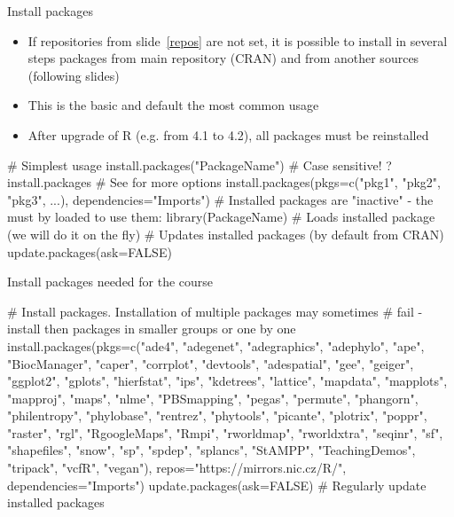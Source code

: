 \documentclass[compress, xelatex, 11pt, xcolor=svgnames, aspectratio=169,
	hyperref={
		bookmarks=true,
		unicode=true,
		colorlinks=true,
		pdftitle={Molecular data in R},
		plainpages=false,
		pdfauthor={Vojtech Zeisek},
		pdfsubject={Course about phylogeny and evolution in R},
		pdfcreator={XeLaTeX},
		pdfkeywords={R, evolution, phylogeny, molecular data},
		linkcolor=Crimson, %
		anchorcolor=Magenta, %
		citecolor=Magenta, %
		filecolor=Magenta, %
		menucolor=Magenta, %
		urlcolor=DodgerBlue, %
		},
	url={hyphens, lowtilde} %
	]{beamer}
\begin{document}
\begin{frame}[fragile]{Install packages}
	\begin{itemize}
		\item If repositories from slide~\ref{repos} are not set, it is possible to install in several steps packages from main repository (CRAN) and from another sources (following slides)
		\item This is the basic and default the most common usage
		\item After upgrade of R (e.g. from 4.1 to 4.2), all packages must be reinstalled
	\end{itemize}
	\begin{spluscode}
    # Simplest usage
    install.packages("PackageName") # Case sensitive!
    ?install.packages # See for more options
    install.packages(pkgs=c("pkg1", "pkg2", "pkg3", ...),
      dependencies="Imports")
    # Installed packages are "inactive" - the must by loaded to use them:
    library(PackageName) # Loads installed package (we will do it on the fly)
    # Updates installed packages (by default from CRAN)
    update.packages(ask=FALSE)
	\end{spluscode}
\end{frame}

\begin{frame}[fragile]{Install packages needed for the course}
	\begin{spluscode}
    # Install packages. Installation of multiple packages may sometimes
    # fail - install then packages in smaller groups or one by one
    install.packages(pkgs=c("ade4", "adegenet", "adegraphics", "adephylo",
      "ape", "BiocManager", "caper", "corrplot", "devtools", "adespatial",
      "gee", "geiger", "ggplot2", "gplots", "hierfstat", "ips", "kdetrees",
      "lattice", "mapdata", "mapplots", "mapproj", "maps", "nlme",
      "PBSmapping", "pegas", "permute", "phangorn", "philentropy",
      "phylobase", "rentrez", "phytools", "picante", "plotrix", "poppr",
      "raster", "rgl", "RgoogleMaps", "Rmpi", "rworldmap", "rworldxtra",
      "seqinr", "sf", "shapefiles", "snow", "sp", "spdep", "splancs",
      "StAMPP", "TeachingDemos", "tripack", "vcfR", "vegan"),
      repos="https://mirrors.nic.cz/R/", dependencies="Imports")
    update.packages(ask=FALSE) # Regularly update installed packages
	\end{spluscode}
\end{frame}
\end{document}
